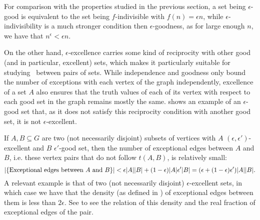        \begin{remark}
            For comparison with the properties studied in the previous section, a set being $\epsilon$-good is equivalent to the
            set being $f$-indivisible with $f(n) = \epsilon n$, while $\epsilon$-indivisibility is a much stronger condition then
            $\epsilon$-goodness, as for large enough $n$, we have that $n^\epsilon < \epsilon n$.

            On the other hand, $\epsilon$-excellence carries some kind of reciprocity with other good (and in particular,
            excellent) sets, which makes it particularly suitable for studying \regularity~between pairs of sets.
            While independence and goodness only bound the number of exceptions with each vertex of the graph independently,
            excellence of a set $A$ also ensures that the truth values of each of its vertex with respect to each
            good set in the graph remains mostly the same.
             shows an example of an $\epsilon$-good set that, as it does not satisfy this
            reciprocity condition with another good set, it is not $\epsilon$-excellent.
        \end{remark}

        \begin{remark} \label{rmk:excellence_imply_little_exceptions}
            If $A, B \subseteq G$ are two (not necessarily disjoint) subsets of vertices
            with $A$ $(\epsilon, \epsilon')$-excellent and $B$ $\epsilon'$-good set, then the number of exceptional edges between $A$ and $B$,
            i.e. these vertex pairs that do not follow $t(A,B)$, is relatively small:
            \[
                | \{ \text{Exceptional edges between } A \text{ and } B \} | <
                    \epsilon |A| |B| + (1- \epsilon) |A| \epsilon' |B| = ( \epsilon + ( 1-\epsilon ) \epsilon' ) |A| |B|.
            \]
            A relevant example is that of two (not necessarily disjoint) $\epsilon$-excellent sets, in which case we have that
            the density (as defined in ) of exceptional edges between them is less than $2\epsilon$.
            See  to see the relation of this density and the real fraction of exceptional
            edges of the pair.
        \end{remark}

